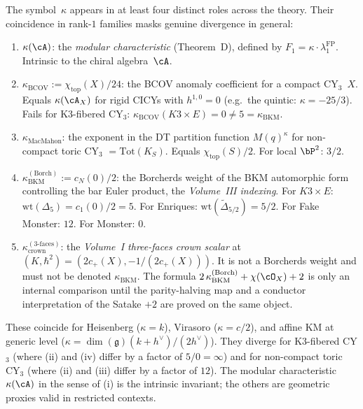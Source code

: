 \begin{remark}%
\label{rem:kappa-polysemy}%
%
The symbol~$\kappa$ appears in at least four distinct roles across the
theory. Their coincidence in rank-$1$ families masks genuine divergence in general:
\begin{enumerate}[label=(\roman*)]
 \item $\kappa(\cA)$: the \emph{modular characteristic} (Theorem~D), defined by $F_1 = \kappa \cdot \lambda_1^{\mathrm{FP}}$. Intrinsic to the chiral algebra~$\cA$.
 \item $\kappa_{\mathrm{BCOV}} := \chi_{\mathrm{top}}(X)/24$: the BCOV anomaly coefficient for a compact CY$_3$~$X$. Equals $\kappa(\cA_X)$ for rigid CICYs with $h^{1,0} = 0$ (e.g.\ the quintic: $\kappa = -25/3$). Fails for K3-fibered CY$_3$: $\kappa_{\mathrm{BCOV}}(K3 \times E) = 0 \neq 5 = \kappa_{\mathrm{BKM}}$.
 \item $\kappa_{\mathrm{MacMahon}}$: the exponent in the DT partition function $M(q)^\kappa$ for non-compact toric CY$_3$ $= \mathrm{Tot}(K_S)$. Equals $\chi_{\mathrm{top}}(S)/2$. For local $\bP^2$: $3/2$.
 \item $\kappa_{\mathrm{BKM}}^{(\mathrm{Borch})} := c_N(0)/2$: the Borcherds weight of the BKM automorphic form controlling the bar Euler product, the \emph{Volume~III indexing}. For $K3 \times E$: $\mathrm{wt}(\Delta_5) = c_1(0)/2 = 5$. For Enriques: $\mathrm{wt}(\tilde\Delta_{5/2}) = 5/2$. For Fake Monster: $12$. For Monster: $0$.
 \item $\kappa_{\mathrm{crown}}^{(3\text{-faces})}$: the \emph{Volume~I three-faces crown scalar} at $(K, \hbar^2) = (2c_+(X), -1/(2c_+(X)))$. It is not a Borcherds weight and must not be denoted $\kappa_{\mathrm{BKM}}$. The formula $2\,\kappa_{\mathrm{BKM}}^{(\mathrm{Borch})}+\chi(\cO_X)+2$ is only an internal comparison until the parity-halving map and a conductor interpretation of the Satake $+2$ are proved on the same object.
\end{enumerate}
These coincide for Heisenberg ($\kappa = k$), Virasoro ($\kappa = c/2$), and affine KM at generic level ($\kappa = \dim(\mathfrak{g})(k{+}h^\vee)/(2h^\vee)$). They diverge for K3-fibered CY$_3$ (where (ii) and (iv) differ by a factor of $5/0 = \infty$) and for non-compact toric CY$_3$ (where (ii) and (iii) differ by a factor of $12$). The modular characteristic $\kappa(\cA)$ in the sense of (i) is the intrinsic invariant; the others are geometric proxies valid in restricted contexts.
\end{remark}

